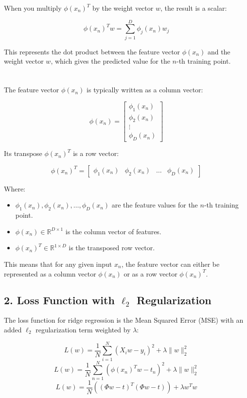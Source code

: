 When you multiply \( \phi(x_n)^T \) by the weight vector \( w \), the result is a scalar:

\[
\phi(x_n)^T w = \sum_{j=1}^{D} \phi_j(x_n) w_j
\]

This represents the dot product between the feature vector \( \phi(x_n) \) and the weight vector \( w \), which gives the predicted value for the \( n \)-th training point. \\ \\
\\
The feature vector \( \phi(x_n) \) is typically written as a column vector:

\[
\phi(x_n) = \begin{bmatrix} \phi_1(x_n) \\ \phi_2(x_n) \\ \vdots \\ \phi_D(x_n) \end{bmatrix}
\]

Its transpose \( \phi(x_n)^T \) is a row vector:

\[
\phi(x_n)^T = \begin{bmatrix} \phi_1(x_n) & \phi_2(x_n) & \dots & \phi_D(x_n) \end{bmatrix}
\]

Where:
\begin{itemize}
    \item \( \phi_1(x_n), \phi_2(x_n), \dots, \phi_D(x_n) \) are the feature values for the \( n \)-th training point.
    \item \( \phi(x_n) \in \mathbb{R}^{D \times 1} \) is the column vector of features.
    \item \( \phi(x_n)^T \in \mathbb{R}^{1 \times D} \) is the transposed row vector.
\end{itemize}

This means that for any given input \( x_n \), the feature vector can either be represented as a column vector \( \phi(x_n) \) or as a row vector \( \phi(x_n)^T \).

\newpage 

\subsection*{2. Loss Function with \( \ell_2 \) Regularization}

The loss function for ridge regression is the Mean Squared Error (MSE) with an added \( \ell_2 \) regularization term weighted by \( \lambda \):

\[
L(w) = \frac{1}{N} \sum_{i=1}^{N} (X_i w - y_i)^2 + \lambda \|w\|_2^2
\]
\[
L(w) = \frac{1}{N} \sum_{n=1}^{N} ( \phi(x_n)^T w - t_n )^2 + \lambda \|w\|_2^2
\]
\[
L(w) = \frac{1}{N} \left( (\Phi w - t)^T (\Phi w - t) \right) + \lambda w^T w
\]  

